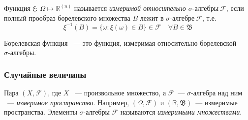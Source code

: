 \begin{defn}
    Функция $\xi$: $\Omega \mapsto \mathbb{R}^{(n)}$ называется {\it измеримой относительно $\sigma\text{-алгебры} \: \mathcal{F}$}, если полный прообраз борелевского множества $B$ лежит в $\sigma\text{-алгебре} \: \mathcal{F}$, т.е. 
    \begin{equation*}
        \xi^{-1}(B) = \{\omega \colon \xi(\omega) \in B \} \in \mathcal{F} \quad \forall B \in \mathfrak{B}
    \end{equation*}
\end{defn}

\begin{rmrk}
    Борелевская функция ~--- это функция, измеримая относительно борелевской ${\sigma \text{-алгебры}}$.
\end{rmrk}

\subsubsection{Случайные величины}
\begin{defn}
    Пара $(X, \mathcal{F})$, где $X$ ~--- произвольное множество, а $\mathcal{F}$~--- $\sigma$-алгебра над ним ~--- {\it измеримое пространство}. Например, $(\Omega, \mathcal{F})$ и $(\mathbb{R}, \mathfrak{B})$~--- измеримые пространства. Элементы $\sigma$-алгебры $\mathcal{F}$ называются {\it измеримыми множествами}.
\end{defn}

